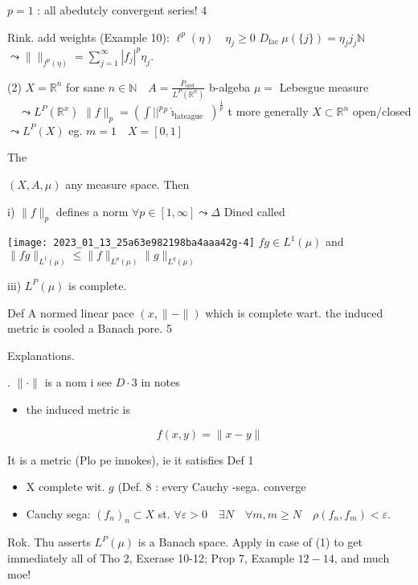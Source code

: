 \documentclass[10pt]{article}
\begin{document}
$p=1$ : all abedutcly convergent series! 4

Rink. add weights (Example 10): $\ell^{p}(\eta) \quad \eta_{j} \geqslant 0$ $D_{\text {fac }} \mu(\{j\})=\eta_{j} j_{j} \mathbb{N}$
$\leadsto\|\|_{f^{p}(\eta)}=\sum_{j=1}^{\infty}\left|f_{j}\right|^{p} \eta_{j}$.

(2) $X=\mathbb{R}^{n}$ for sane $n \in \mathbb{N} \quad A=\frac{P_{\text {orel }}}{L^{P}\left(\mathbb{R}^{n}\right)}$ b-algeba $\mu=$ Lebesgue measure $\quad \leadsto L^{P}\left(\mathbb{R}^{x}\right)$ $\|f\|_{p}=\left(\int||^{p}{ }^{p} \hat{\imath}_{\text {lateague }}\right)^{\frac{1}{p}}$ t more generally $X \subset \mathbb{R}^{n}$ open/closed $\leadsto L^{P}(X)$ eg. $m=1 \quad X=[0,1]$

The

$(X, A, \mu)$ any measure space. Then

i) $\|f\|_{p}$ defines a norm $\forall p \in[1, \infty] \leadsto \Delta$ Dined called

\texttt{[image: 2023\_01\_13\_25a63e982198ba4aaa42g-4]}
$f g \in L^{1}(\mu)$ and $\|f g\|_{L^{1}(\mu)} \leqslant\|f\|_{L^{p}(\mu)}\|g\|_{L^{q}(\mu)}$

iii) $L^{P}(\mu)$ is complete.

Def A normed linear pace $(x,\|-\|)$ which is complete wart. the induced metric is cooled a Banach pore. 5

Explanations.

. $\|\cdot\|$ is a nom i see $D \cdot 3$ in notes

\begin{itemize}
  \item the induced metric is
\end{itemize}

$$
f(x, y)=\|x-y\|
$$

It is a metric (Plo pe innokes), ie it satisfies Def 1

\begin{itemize}
  \item X complete wit. $g$ (Def. 8 : every Cauchy -sega. converge

  \item Cauchy sega: $\left(f_{n}\right)_{n} \subset X$ st. $\forall \varepsilon>0 \quad \exists N \quad \forall m, m \geqslant N \quad \rho\left(f_{n}, f_{m}\right)<\varepsilon$.

\end{itemize}

Rok. Thu asserts $L^{P}(\mu)$ is a Banach space. Apply in case of (1) to get immediately all of Tho 2, Exerase 10-12; Prop 7, Example $12-14$, and much moe!
\end{document}
